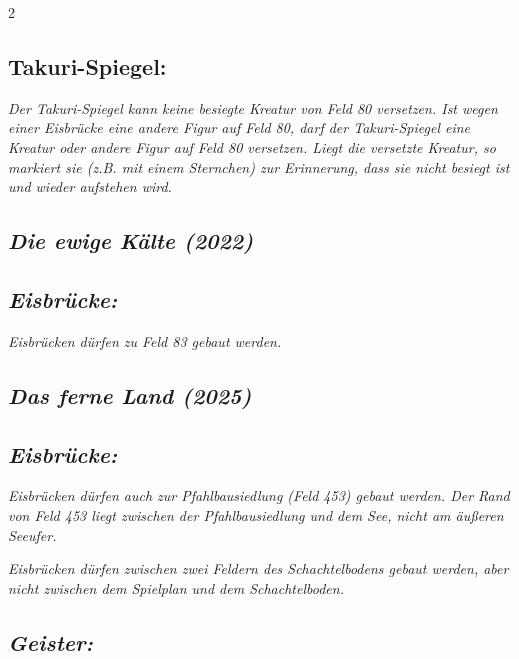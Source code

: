 \documentclass[10pt, a4paper, oneside]{book}
\newcommand{\fan}[1]{\textit{#1}}
\begin{document}
\begin{multicols*}{2}
\begin{bgcolor}[color-ag]
\subsection{Takuri-Spiegel:}

\fan{Der Takuri-Spiegel kann keine besiegte Kreatur von Feld 80 versetzen. Ist wegen einer Eisbrücke eine andere Figur auf Feld 80, darf der Takuri-Spiegel eine Kreatur oder andere Figur auf Feld 80 versetzen. Liegt die versetzte Kreatur, so markiert sie (z.B. mit einem Sternchen) zur Erinnerung, dass sie nicht besiegt ist und wieder aufstehen wird.}

\end{bgcolor}




\begin{bgcolor}
\section{\fan{Die ewige Kälte (2022)}}

\subsection{\fan{Eisbrücke:}}

\fan{Eisbrücken dürfen zu Feld 83 gebaut werden.}

\end{bgcolor}



\columnbreak


\begin{bgcolor}
\section{\fan{Das ferne Land (2025)}}

\subsection{\fan{Eisbrücke:}}

\fan{Eisbrücken dürfen auch zur Pfahlbausiedlung (Feld 453) gebaut werden. Der Rand von Feld 453 liegt zwischen der Pfahlbausiedlung und dem See, nicht am äußeren Seeufer.}

\fan{Eisbrücken dürfen zwischen zwei Feldern des Schachtelbodens gebaut werden, aber nicht zwischen dem Spielplan und dem Schachtelboden.}


\subsection{\fan{Geister:}}


\end{bgcolor}
\end{multicols*}
\end{document}
